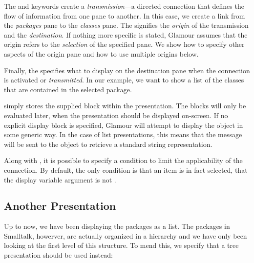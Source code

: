\documentclass[a4paper,10pt,twoside]{book}
\begin{document}
The  and  keywords create a
\emph{transmission}---a directed connection that defines the flow of
information from one pane to another. In this case, we create a link
from the \emph{packages} pane to the \emph{classes} pane. The
 signifies the \emph{origin} of the transmission and
 the \emph{destination}. If nothing more specific is
stated, Glamour assumes that the origin refers to the \emph{selection}
of the specified pane. We show how to specify other aspects of the
origin pane and how to use multiple origins below.

Finally, the  specifies what to display on the destination
pane when the connection is activated or \emph{transmitted}. In our
example, we want to show a list of the classes that are contained in
the selected package.

 simply stores the supplied block within the
presentation. The blocks will only be evaluated later, when the
presentation should be displayed on-screen. If no explicit display
block is specified, Glamour will attempt to display the object in some
generic way. In the case of list presentations, this means that the
 message will be sent to the object to retrieve a
standard string representation.

Along with , it is possible to specify a 
condition to limit the applicability of the connection. By default,
the only condition is that an item is in fact selected, \ie{} that the
display variable argument is not .

\subsection{Another Presentation}

Up to now, we have been displaying the packages as a list. The
packages in Smalltalk, howerver, are actually organized in a hierarchy
and we have only been looking at the first level of this structure. To
mend this, we specify that a tree presentation should be used instead:

\end{document}
